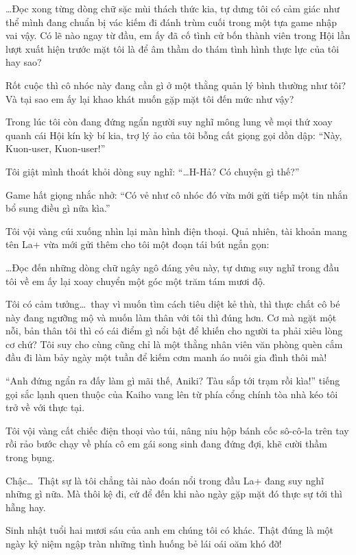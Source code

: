 \documentclass[../main.tex]{subfiles}
\begin{document}
\dots Đọc xong từng dòng chữ sặc mùi thách thức kia, tự dưng tôi có cảm giác như thể mình đang chuẩn bị vác kiếm đi đánh trùm cuối trong một tựa game nhập vai vậy. Có lẽ nào ngay từ đầu, em ấy đã cố tình cử bốn thành viên trong Hội lần lượt xuất hiện trước mặt tôi là để âm thầm do thám tình hình thực lực của tôi hay sao?

Rốt cuộc thì cô nhóc này đang cần gì ở một thằng quản lý bình thường như tôi? Và tại sao em ấy lại khao khát muốn gặp mặt tôi đến mức như vậy?

Trong lúc tôi còn đang đứng ngẩn người suy nghĩ mông lung về mọi thứ xoay quanh cái Hội kín kỳ bí kia, trợ lý ảo của tôi bỗng cất giọng gọi dồn dập: ``Này, Kuon-user, Kuon-user!''

Tôi giật mình thoát khỏi dòng suy nghĩ:
``\dots H-Hả? Có chuyện gì thế?''

Game hất giọng nhắc nhở: ``Có vẻ như cô nhóc đó vừa mới gửi tiếp một tin nhắn bổ sung điều gì nữa kìa.''

Tôi vội vàng cúi xuống nhìn lại màn hình điện thoại. Quả nhiên, tài khoản mang tên La+ vừa mới gửi thêm cho tôi một đoạn tái bút ngắn gọn:


\dots Đọc đến những dòng chữ ngây ngô đáng yêu này, tự dưng suy nghĩ trong đầu tôi về em ấy lại xoay chuyển một góc một trăm tám mươi độ.

Tôi có cảm tưởng\dots\ thay vì muốn tìm cách tiêu diệt kẻ thù, thì thực chất cô bé này đang ngưỡng mộ và muốn làm thân với tôi thì đúng hơn. Cơ mà ngặt một nỗi, bản thân tôi thì có cái điểm gì nổi bật để khiến cho người ta phải xiêu lòng cơ chứ? Tôi suy cho cùng cũng chỉ là một thằng nhân viên văn phòng quèn cắm đầu đi làm bảy ngày một tuần để kiếm cơm manh áo nuôi gia đình thôi mà!

``Anh đứng ngẩn ra đấy làm gì mãi thế, Aniki? Tàu sắp tới trạm rồi kìa!'' tiếng gọi sắc lạnh quen thuộc của Kaiho vang lên từ phía cổng chính tòa nhà kéo tôi trở về với thực tại.

Tôi vội vàng cất chiếc điện thoại vào túi, nâng niu hộp bánh cốc sô-cô-la trên tay rồi rảo bước chạy về phía cô em gái song sinh đang đứng đợi, khẽ cười thầm trong bụng.

Chậc\dots\ Thật sự là tôi chẳng tài nào đoán nổi trong đầu La+ đang suy nghĩ những gì nữa. Mà thôi kệ đi, cứ để đến khi nào ngày gặp mặt đó thực sự tới thì hẵng hay.

Sinh nhật tuổi hai mươi sáu của anh em chúng tôi có khác. Thật đúng là một ngày kỷ niệm ngập tràn những tình huống bẻ lái oái oăm khó đỡ!
\end{document}
